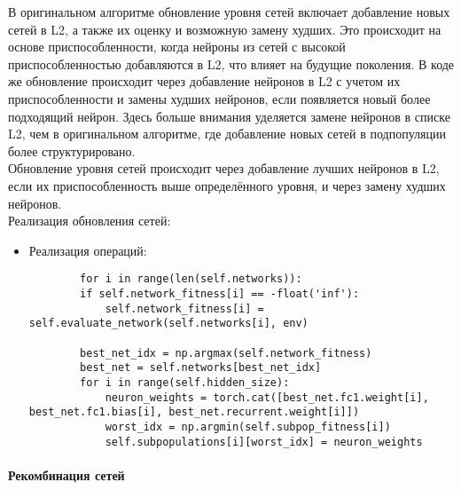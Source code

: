 \documentclass[a4paper,12pt]{article}
\begin{document}
В оригинальном алгоритме обновление уровня сетей включает добавление новых сетей в L2, а также их оценку и возможную замену худших. Это происходит на основе приспособленности, когда нейроны из сетей с высокой приспособленностью добавляются в L2, что влияет на будущие поколения. В коде же обновление происходит через добавление нейронов в L2 с учетом их приспособленности и замены худших нейронов, если появляется новый более подходящий нейрон. Здесь больше внимания уделяется замене нейронов в списке L2, чем в оригинальном алгоритме, где добавление новых сетей в подпопуляции более структурировано.~\\
Обновление уровня сетей происходит через добавление лучших нейронов в L2, если их приспособленность выше определённого уровня, и через замену худших нейронов.~\\
Реализация обновления сетей:
\begin{itemize}
	\item[] Реализация операций:
	\begin{lstlisting}
		for i in range(len(self.networks)):
        if self.network_fitness[i] == -float('inf'):
            self.network_fitness[i] = self.evaluate_network(self.networks[i], env)

        best_net_idx = np.argmax(self.network_fitness)
        best_net = self.networks[best_net_idx]
        for i in range(self.hidden_size):
            neuron_weights = torch.cat([best_net.fc1.weight[i], best_net.fc1.bias[i], best_net.recurrent.weight[i]])
            worst_idx = np.argmin(self.subpop_fitness[i])
            self.subpopulations[i][worst_idx] = neuron_weights
	\end{lstlisting}
\end{itemize}




\paragraph{Рекомбинация сетей}~\\
\end{document}
